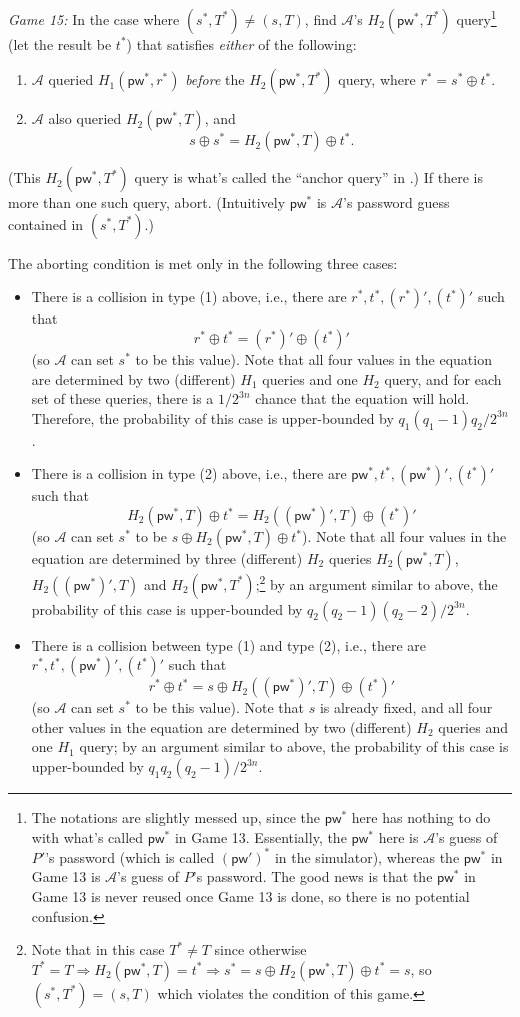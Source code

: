 \documentclass{article}
\theoremstyle{plain}
\theoremstyle{definition}
\theoremstyle{remark}
\newcommand{\adv}{\mathcal{A}}
\newcommand{\pw}{\mathsf{pw}}
\begin{document}
\medskip\noindent\emph{Game 15:} In the case where $(s^*,T^*) \neq (s,T)$, find $\adv$'s $H_2(\pw^*,T^*)$ query\footnote{\label{footnote:notations}The notations are slightly messed up, since the $\pw^*$ here has nothing to do with what's called $\pw^*$ in Game 13. Essentially, the $\pw^*$ here is $\adv$'s guess of $P'$'s password (which is called $(\pw')^*$ in the simulator), whereas the $\pw^*$ in Game 13 is $\adv$'s guess of $P$'s password. The good news is that the $\pw^*$ in Game 13 is never reused once Game 13 is done, so there is no potential confusion.} (let the result be $t^*$) that satisfies \emph{either} of the following:
\begin{enumerate}
  \item $\adv$ queried $H_1(\pw^*,r^*)$ \emph{before} the $H_2(\pw^*,T^*)$ query, where $r^* = s^* \oplus t^*$.
  \item $\adv$ also queried $H_2(\pw^*,T)$, and
      \[
      s \oplus s^* = H_2(\pw^*,T) \oplus t^*.
      \]
\end{enumerate}
(This $H_2(\pw^*,T^*)$ query is what's called the ``anchor query'' in \cite{EC:JanRoyXu25}.) If there is more than one such query, abort. (Intuitively $\pw^*$ is $\adv$'s password guess contained in $(s^*,T^*)$.)

The aborting condition is met only in the following three cases:
\begin{itemize}
  \item There is a collision in type (1) above, i.e., there are $r^*,t^*,(r^*)',(t^*)'$ such that
      \[
      r^* \oplus t^* = (r^*)' \oplus (t^*)'
      \]
      (so $\adv$ can set $s^*$ to be this value). Note that all four values in the equation are determined by two (different) $H_1$ queries and one $H_2$ query, and for each set of these queries, there is a $1/2^{3n}$ chance that the equation will hold. Therefore, the probability of this case is upper-bounded by $q_1(q_1-1)q_2/2^{3n}$.
  \item There is a collision in type (2) above, i.e., there are $\pw^*,t^*,(\pw^*)',(t^*)'$ such that
      \[
      H_2(\pw^*,T) \oplus t^* = H_2((\pw^*)',T) \oplus (t^*)'
      \]
      (so $\adv$ can set $s^*$ to be $s \oplus H_2(\pw^*,T) \oplus t^*$). Note that all four values in the equation are determined by three (different) $H_2$ queries $H_2(\pw^*,T)$, $H_2((\pw^*)',T)$ and $H_2(\pw^*,T^*)$;\footnote{Note that in this case $T^* \neq T$ since otherwise $T^* = T \Rightarrow H_2(\pw^*,T) = t^* \Rightarrow s^* = s \oplus H_2(\pw^*,T) \oplus t^* = s$, so $(s^*,T^*) = (s,T)$ which violates the condition of this game.} by an argument similar to above, the probability of this case is upper-bounded by $q_2(q_2-1)(q_2-2)/2^{3n}$.
  \item There is a collision between type (1) and type (2), i.e., there are $r^*,t^*,(\pw^*)',\allowbreak(t^*)'$ such that
      \[
      r^* \oplus t^* = s \oplus H_2((\pw^*)',T) \oplus (t^*)'
      \]
      (so $\adv$ can set $s^*$ to be this value). Note that $s$ is already fixed, and all four other values in the equation are determined by two (different) $H_2$ queries and one $H_1$ query; by an argument similar to above, the probability of this case is upper-bounded by $q_1q_2(q_2-1)/2^{3n}$.
\end{itemize}
\end{document}
